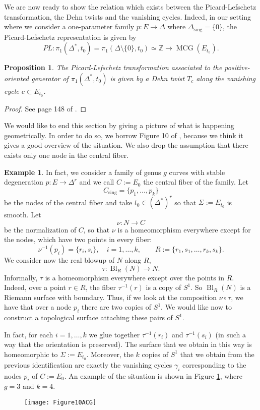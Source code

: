 \documentclass[a4paper,12 pt,titlepage,twoside]{book}
\newcommand{\numberset}{\mathbb}
\newcommand{\Z}{\numberset{Z}}
\DeclareMathOperator{\mcg}{MCG}
\DeclareMathOperator{\bl}{Bl}
\theoremstyle{plain}
\theoremstyle{theorem}
\newtheorem{prop}[thm]{Proposition}
\theoremstyle{definition}
\newtheorem{exm}[thm]{Example}
\theoremstyle{remark}
\begin{document}
We are now ready to show the relation which exists between the Picard-Lefschetz transformation, the Dehn twists and the vanishing cycles. Indeed, in our setting where we consider a one-parameter family $p \colon E \rightarrow \Delta$ where $\Delta_{\text{sing}} =\{0\}$, the Picard-Lefschetz representation is given by $$PL \colon \pi_1(\Delta^*, t_0) = \pi_1(\Delta \setminus \{0\}, t_0) \simeq \Z \rightarrow \mcg(E_{t_0}).$$
\begin{prop}\label{prop: monodromy associated to picard lefschetz representation}
	The Picard-Lefschetz transformation associated to the positive-oriented generator of $\pi_1(\Delta^*,t_0)$ is given by a Dehn twist $T_c$ along the vanishing cycle $c \subset E_{t_0}$.
\end{prop}
\begin{proof}
	See page 148 of \cite{MR2807457}.
\end{proof}
We would like to end this section by giving a picture of what is happening geometrically. In order to do so, we borrow Figure 10 of \cite{MR2807457}, because we think it gives a good overview of the situation. We also drop the assumption that there exists only one node in the central fiber.
\begin{exm}
	In fact, we consider a family of genus $g$ curves with stable degeneration $p \colon E \rightarrow \Delta^r$ and we call $C:=E_0$ the central fiber of the family. Let $$C_{\text{sing}} =\{p_1, \dots, p_k\}$$ be the nodes of the central fiber and take $t_0 \in (\Delta^*)^r$ so that $\Sigma:= E_{t_0}$ is smooth. Let $$\nu \colon N \rightarrow C$$ be the normalization of $C$, so that $\nu$ is a homeomorphism everywhere except for the nodes, which have two points in every fiber: $$\nu^{-1}(p_i) = \{r_i, s_i\}, \quad i=1, \dots, k, \qquad R:= \{r_1, s_1, \dots, r_k,s_k\}.$$ We consider now the real blowup of $N$ along $R$, $$\tau \colon \bl_R(N) \rightarrow N.$$ Informally, $\tau$ is a homeomorphism everywhere except over the points in $R$. Indeed, over a point $r \in R$, the fiber $\tau^{-1}(r)$ is a copy of $S^1.$ So $\bl_R(N)$ is a Riemann surface with boundary. Thus, if we look at the composition $\nu \circ \tau$, we have that over a node $p_i$ there are two copies of $S^1.$ We would like now to construct a topological surface attaching these pairs of $S^1$. 
	
	In fact, for each $i =1, \dots, k$ we glue together $\tau^{-1}(r_i)$ and $\tau^{-1}(s_i)$ (in such a way that the orientation is preserved). The surface that we obtain in this way is homeomorphic to $\Sigma:= E_{t_0}.$ Moreover, the $k$ copies of $S^1$ that we obtain from the previous identification are exactly the vanishing cycles $\gamma_i$ corresponding to the nodes $p_i$ of $C:= E_0.$
	An example of the situation is shown in Figure \ref{fig: general picture of picard-lefschetz}, where $g=3$ and $k=4$.
	\begin{figure}[h!]
		\centering
		\caption{}
		\label{fig: general picture of picard-lefschetz}
		\texttt{[image: Figure10ACG]}
	\end{figure}
\end{exm}
\end{document}
